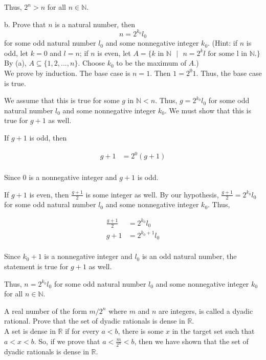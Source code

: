 \documentclass[addpoints]{exam}
\begin{document}
\begin{questions}
Thus, $2^n > n$ for all $n \in \mathbb{N}$.

b. Prove that $n$ is a natural number, then 
\[n = 2^{k_0}l_0\]
for some odd natural number $l_0$ and some nonnegative integer $k_0$. (Hint: if $n$ is odd, 
let $k= 0$ and $l = n$; if $n$ is even, let $A = \{k \text{ in } \mathbb{N} \text{ } | \text{ }
n = 2^{k}l \text{ for some } $l$ \text{ in } \mathbb{N}.\}$ By (a), $A \subseteq \{1, 2, ..., n\}$. Choose
$k_0$ to be the maximum of $A$.)\\

We prove by induction. The base case is $n = 1$. Then $1 = 2^{0}1$. Thus, the base case is true.

We assume that this is true for some $g$ in $\mathbb{N} < n$. Thus, $g = 2^{k_0}l_0$ for some
odd natural number $l_0$ and some nonnegative integer $k_0$. We must show that this is true for $g+1$
as well. 

If $g + 1$ is odd, then 

\begin{align*}
    g + 1 &= 2^0(g+1) \\
\end{align*}

Since $0$ is a nonnegative integer and $g+1$ is odd. 

If $g + 1$ is even, then $\frac{g + 1}{2}$ is some integer as well. By our 
hypothesis, $\frac{g + 1}{2} = 2^{k_0}l_0$ for some odd natural number $l_0$ and some nonnegative integer $k_0$. Thus,

\begin{align*}
    \frac{g + 1}{2} &= 2^{k_0}l_0 \\
    g + 1 &= 2^{k_0+1}l_0 \\
\end{align*}

Since $k_0 + 1$ is a nonnegative integer and $l_0$ is an odd natural number,
the statement is true for $g+1$ as well.

Thus, $n = 2^{k_0}l_0$ for some odd natural number $l_0$ and some nonnegative integer $k_0$ for all 
$n \in \mathbb{N}$.

\question A real number of the form $m/2^n$ where $m$ and $n$ are integers, is
called a dyadic rational. Prove that the set of dyadic rationals is dense in $\mathbb{R}$.\\

A set is dense in $\mathbb{R}$ if for every $a < b$, there is some $x$ in the target set
such that $a < x < b$. So, if we prove that $a < \frac{m}{2^n} < b$, then we have shown that
the set of dyadic rationals is dense in $\mathbb{R}$.


\end{questions}
\end{document}
